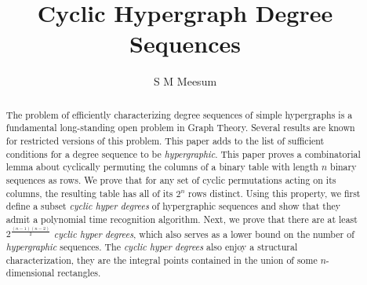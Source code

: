 \documentclass[a4paper,UKenglish]{lipics-v2016}
\title{Cyclic Hypergraph Degree Sequences}
\author{S M Meesum}
\affil{The Institute of Mathematical Sciences,\\ HBNI, Chennai, India.\\
\texttt{meesum@imsc.res.in}}
\begin{document}
\maketitle
\begin{abstract}
The problem of efficiently characterizing degree sequences of simple hypergraphs is a fundamental long-standing open problem in Graph Theory.
Several results are known for restricted versions of this problem. This paper adds to the list of sufficient conditions for a degree sequence to be {\em hypergraphic}.
This paper proves a combinatorial lemma about cyclically permuting the columns of a binary table with length $n$ binary sequences as rows. We prove that for any set of cyclic permutations acting on its columns, the resulting table has all of its $2^n$ rows distinct. Using this property, we first define a subset {\em cyclic hyper degrees} of hypergraphic sequences and show that they admit a polynomial time recognition algorithm. Next, we prove that there are at least $2^{\frac{(n-1)(n-2)}{2}}$ {\em cyclic hyper degrees}, which also serves as a lower bound on the number of {\em hypergraphic} sequences. The {\em cyclic hyper degrees} also enjoy a structural characterization, they are the integral points contained in the union of some $n$-dimensional rectangles.
\end{abstract}








%

\end{document}
